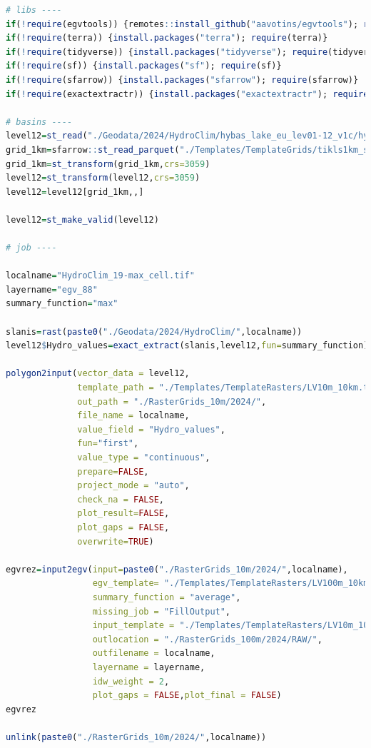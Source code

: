 \documentclass[
]{book}
\begin{document}
\begin{lstlisting}[language=R]
# libs ----
if(!require(egvtools)) {remotes::install_github("aavotins/egvtools"); require(egvtools)}
if(!require(terra)) {install.packages("terra"); require(terra)}
if(!require(tidyverse)) {install.packages("tidyverse"); require(tidyverse)}
if(!require(sf)) {install.packages("sf"); require(sf)}
if(!require(sfarrow)) {install.packages("sfarrow"); require(sfarrow)}
if(!require(exactextractr)) {install.packages("exactextractr"); require(exactextractr)}

# basins ----
level12=st_read("./Geodata/2024/HydroClim/hybas_lake_eu_lev01-12_v1c/hybas_lake_eu_lev12_v1c.shp")
grid_1km=sfarrow::st_read_parquet("./Templates/TemplateGrids/tikls1km_sauzeme.parquet")
grid_1km=st_transform(grid_1km,crs=3059)
level12=st_transform(level12,crs=3059)
level12=level12[grid_1km,,]

level12=st_make_valid(level12)

# job ----

localname="HydroClim_19-max_cell.tif"
layername="egv_88"
summary_function="max"
  
slanis=rast(paste0("./Geodata/2024/HydroClim/",localname))
level12$Hydro_values=exact_extract(slanis,level12,fun=summary_function)
  
polygon2input(vector_data = level12,
              template_path = "./Templates/TemplateRasters/LV10m_10km.tif",
              out_path = "./RasterGrids_10m/2024/",
              file_name = localname,
              value_field = "Hydro_values",
              fun="first",
              value_type = "continuous",
              prepare=FALSE,
              project_mode = "auto",
              check_na = FALSE,
              plot_result=FALSE,
              plot_gaps = FALSE,
              overwrite=TRUE)
  
egvrez=input2egv(input=paste0("./RasterGrids_10m/2024/",localname),
                 egv_template= "./Templates/TemplateRasters/LV100m_10km.tif",
                 summary_function = "average",
                 missing_job = "FillOutput",
                 input_template = "./Templates/TemplateRasters/LV10m_10km.tif",
                 outlocation = "./RasterGrids_100m/2024/RAW/",
                 outfilename = localname,
                 layername = layername,
                 idw_weight = 2,
                 plot_gaps = FALSE,plot_final = FALSE)
egvrez
  
unlink(paste0("./RasterGrids_10m/2024/",localname))
\end{lstlisting}
\end{document}
